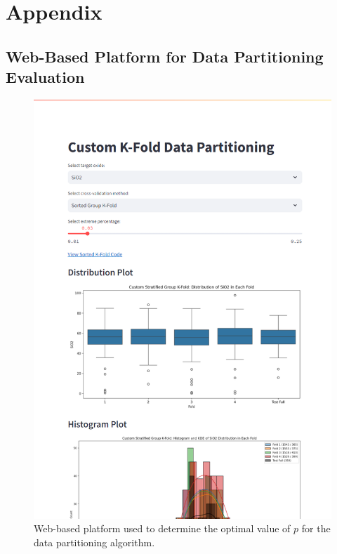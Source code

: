 \section*{Appendix}

\subsection{Web-Based Platform for Data Partitioning Evaluation}\label{subsec:web_platform}

\begin{figure}[h]
    \centering
    \includegraphics[width=\textwidth]{images/web_platform.png}
    \caption{Web-based platform used to determine the optimal value of $p$ for the data partitioning algorithm.}
    \label{fig:web_platform}
\end{figure}

